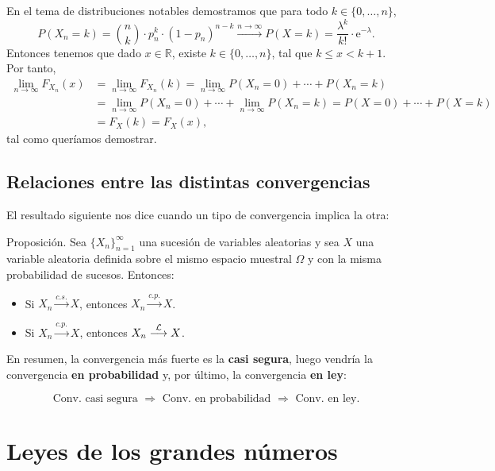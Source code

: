 \documentclass[]{book}
\begin{document}
En el tema de distribuciones notables demostramos que para todo \(k\in\{0,\ldots,n\}\),
\[
P(X_n = k)=\binom{n}{k}\cdot p_n^k\cdot (1-p_n)^{n-k}\stackrel{n\to\infty}{\longrightarrow} P(X=k)=\frac{\lambda^k}{k!}\cdot\mathrm{e}^{-\lambda}.
\]
Entonces tenemos que dado \(x\in\mathbb{R}\), existe \(k\in\{0,\ldots,n\}\), tal que \(k\leq x< k+1\). Por tanto,
\[
\begin{array}{rl}
\lim\limits_{n\to\infty} F_{X_n}(x) & = \lim\limits_{n\to\infty} F_{X_n}(k)=\lim\limits_{n\to\infty} P(X_n=0)+\cdots + P(X_n=k) \\  & =\lim\limits_{n\to\infty} P(X_n=0)+\cdots + \lim\limits_{n\to\infty} P(X_n=k) = P(X=0)+\cdots + P(X=k)\\ &  =F_X(k)=F_X(x),
\end{array}
\]
tal como queríamos demostrar.

\hypertarget{relaciones-entre-las-distintas-convergencias}{%
\subsection{Relaciones entre las distintas convergencias}\label{relaciones-entre-las-distintas-convergencias}}

El resultado siguiente nos dice cuando un tipo de convergencia implica la otra:

 Proposición.
Sea \(\{X_n\}_{n=1}^\infty\) una sucesión de variables aleatorias y sea \(X\) una variable aleatoria definida sobre el mismo espacio muestral \(\Omega\) y con la misma probabilidad de sucesos. Entonces:

\begin{itemize}
\item
  Si \(X_n\stackrel{c.s.}{\longrightarrow} X\), entonces \(X_n\stackrel{c.p.}{\longrightarrow} X\).
\item
  Si \(X_n\stackrel{c.p.}{\longrightarrow} X\), entonces \(X_n\stackrel{{\cal L}}{\longrightarrow} X\).
\end{itemize}

En resumen, la convergencia más fuerte es la \textbf{casi segura}, luego vendría la convergencia \textbf{en probabilidad} y, por último, la convergencia \textbf{en ley}:

\[
\mbox{Conv. casi segura }\Rightarrow \mbox{ Conv. en probabilidad }\Rightarrow\mbox{ Conv. en ley.}
\]

\hypertarget{leyes-de-los-grandes-nuxfameros}{%
\section{Leyes de los grandes números}\label{leyes-de-los-grandes-nuxfameros}}
\end{document}
